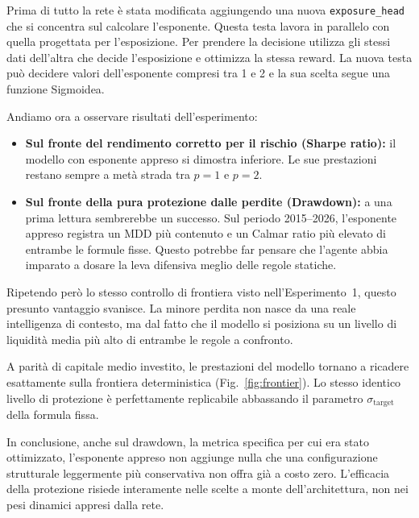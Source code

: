 Prima di tutto la rete è stata modificata aggiungendo una nuova \lstinline{exposure_head} che si concentra sul calcolare l'esponente.
Questa testa lavora in parallelo con quella progettata per l'esposizione.
Per prendere la decisione utilizza gli stessi dati dell'altra che decide l'esposizione e ottimizza la stessa reward.
La nuova testa può decidere valori dell'esponente compresi tra 1 e 2 e la sua scelta segue una funzione Sigmoidea.

Andiamo ora a osservare risultati dell'esperimento:
\begin{itemize}
    \item \textbf{Sul fronte del rendimento corretto per il rischio (Sharpe ratio):} il modello con esponente appreso si dimostra inferiore. Le sue prestazioni restano sempre a metà strada tra $p=1$ e $p=2$.
    \item \textbf{Sul fronte della pura protezione dalle perdite (Drawdown):} a una prima lettura sembrerebbe un successo. Sul periodo 2015--2026, l'esponente appreso registra un MDD più contenuto e un Calmar ratio più elevato di entrambe le formule fisse. Questo potrebbe far pensare che l'agente abbia imparato a dosare la leva difensiva meglio delle regole statiche.
\end{itemize}

Ripetendo però lo stesso controllo di frontiera visto nell'Esperimento~1, questo presunto vantaggio svanisce. La minore perdita non nasce da una reale intelligenza di contesto, ma dal fatto che il modello si posiziona su un livello di liquidità media più alto di entrambe le regole a confronto. 

A parità di capitale medio investito, le prestazioni del modello tornano a ricadere esattamente sulla frontiera deterministica (Fig.~\ref{fig:frontier}). Lo stesso identico livello di protezione è perfettamente replicabile abbassando il parametro $\sigma_{\mathrm{target}}$ della formula fissa.

In conclusione, anche sul drawdown, la metrica specifica per cui era stato ottimizzato, l'esponente appreso non aggiunge nulla che una configurazione strutturale leggermente più conservativa non offra già a costo zero. L'efficacia della protezione risiede interamente nelle scelte a monte dell'architettura, non nei pesi dinamici appresi dalla rete.

